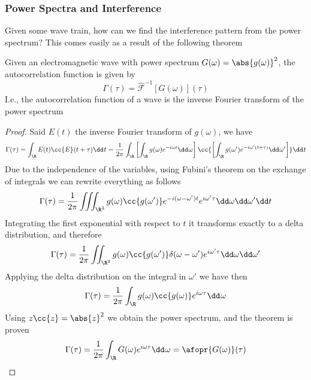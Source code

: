 \documentclass[../electromagnetism.tex]{subfiles}
\begin{document}
\subsubsection{Power Spectra and Interference}
Given some wave train, how can we find the interference pattern from the power spectrum? This comes easily as a result of the following theorem
\begin{thm}
	Given an electromagnetic wave with power spectrum $G(\omega)=\abs{g(\omega)}^2$, the autocorrelation function is given by
	\begin{equation}
		\Gamma(\tau)=\mathcal{\hat{F}}^{-1}\left[ G(\omega) \right](\tau)
		\label{eq:wienerkhnstatement.cfc}
	\end{equation}
	I.e., the autocorrelation function of a wave is the inverse Fourier transform of the power spectrum
\end{thm}
\begin{proof}
	Said $E(t)$ the inverse Fourier transform of $g(\omega)$, we have
	\begin{equation*}
		\Gamma(\tau)=\int_{\R}^{}E(t)\cc{E}(t+\tau)\dd^{}{t}=\frac{1}{2\pi}\int_{\R}^{}\left[ \int_{\R}^{}g(\omega)e^{-i\omega t}\dd^{}{\omega} \right]\cc{\left[ \int_{\R}^{}g(\omega')e^{-i\omega'(t+\tau)}\dd^{}{\omega'} \right]}\dd^{}{t}
	\end{equation*}
	Due to the independence of the variables, using Fubini's theorem on the exchange of integrals we can rewrite everything as follows
	\begin{equation*}
		\Gamma(\tau)=\frac{1}{2\pi}\iiint_{\R^3}g(\omega)\cc{g(\omega')}e^{-i(\omega-\omega')t}e^{i\omega'\tau}\dd\omega\dd\omega'\dd t
	\end{equation*}
	Integrating the first exponential with respect to $t$ it transforms exactly to a delta distribution, and therefore
	\begin{equation*}
		\Gamma(\tau)=\frac{1}{2\pi}\iint_{\R^2}g(\omega)\cc{g(\omega')}\delta(\omega-\omega')e^{i\omega'\tau}\dd\omega\dd\omega'
	\end{equation*}
	Applying the delta distribution on the integral in $\omega'$ we have then
	\begin{equation*}
		\Gamma(\tau)=\frac{1}{2\pi}\int_{\R}^{}g(\omega)\cc{g(\omega)}e^{i\omega\tau}\dd^{}{\omega}
	\end{equation*}
	Using $z\cc{z}=\abs{z}^2$ we obtain the power spectrum, and the theorem is proven
	\begin{equation*}
		\Gamma(\tau)=\frac{1}{2\pi}\int_{\R}^{}G(\omega)e^{i\omega\tau}\dd^{}{\omega}=\afopr{G(\omega)}(\tau)
	\end{equation*}
\end{proof}
\end{document}
